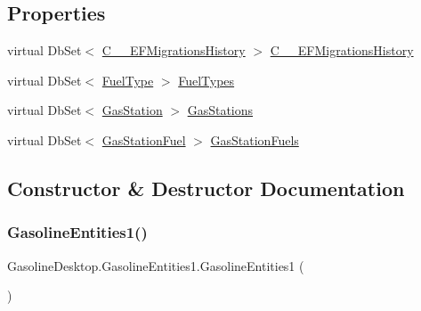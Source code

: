 \subsection*{Properties}
\begin{DoxyCompactItemize}
\item 
virtual Db\+Set$<$ \mbox{\hyperlink{class_gasoline_desktop_1_1_c_____e_f_migrations_history}{C\+\_\+\+\_\+\+E\+F\+Migrations\+History}} $>$ \mbox{\hyperlink{class_gasoline_desktop_1_1_gasoline_entities1_a19de53739a55f01aa91b80c1caec43e5}{C\+\_\+\+\_\+\+E\+F\+Migrations\+History}}
\item 
virtual Db\+Set$<$ \mbox{\hyperlink{class_gasoline_desktop_1_1_fuel_type}{Fuel\+Type}} $>$ \mbox{\hyperlink{class_gasoline_desktop_1_1_gasoline_entities1_a5859b87e105585f77d9223c6a33ae5e5}{Fuel\+Types}}
\item 
virtual Db\+Set$<$ \mbox{\hyperlink{class_gasoline_desktop_1_1_gas_station}{Gas\+Station}} $>$ \mbox{\hyperlink{class_gasoline_desktop_1_1_gasoline_entities1_ab83012308cfb0a8b705e3119d2d2cf9f}{Gas\+Stations}}
\item 
virtual Db\+Set$<$ \mbox{\hyperlink{class_gasoline_desktop_1_1_gas_station_fuel}{Gas\+Station\+Fuel}} $>$ \mbox{\hyperlink{class_gasoline_desktop_1_1_gasoline_entities1_a6737cc16941ef917417d1e569e4c8af3}{Gas\+Station\+Fuels}}
\end{DoxyCompactItemize}


\subsection{Constructor \& Destructor Documentation}
\mbox{\label{class_gasoline_desktop_1_1_gasoline_entities1_a3c61819e52e5b6bb466b44324b1cfbc6}} 
\subsubsection{\texorpdfstring{GasolineEntities1()}{GasolineEntities1()}}
{\footnotesize\ttfamily Gasoline\+Desktop.\+Gasoline\+Entities1.\+Gasoline\+Entities1 (\begin{DoxyParamCaption}{ }\end{DoxyParamCaption})}



